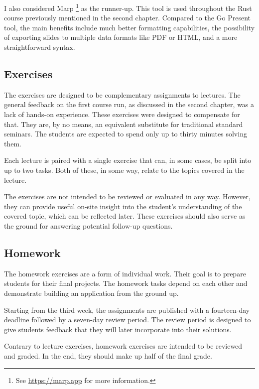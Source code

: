 \documentclass[
  digital,
  color,
  oneside,
  nosansbold,
  nocolorbold,
  lof,
  lot,
]{fithesis4}
\begin{document}
I also considered Marp
\footnote{See \url{https://marp.app} for more information.}
as the runner-up. This tool is used throughout the Rust course previously mentioned in the second chapter. Compared to the Go Present tool, the main benefits include much better formatting capabilities, the possibility of exporting slides to multiple data formats like PDF or HTML, and a more straightforward syntax.

\subsection{Exercises}

The exercises are designed to be complementary assignments to lectures. The general feedback on the first course run, as discussed in the second chapter, was a lack of hands-on experience. These exercises were designed to compensate for that. They are, by no means, an equivalent substitute for traditional standard seminars. The students are expected to spend only up to thirty minutes solving them.

Each lecture is paired with a single exercise that can, in some cases, be split into up to two tasks. Both of these, in some way, relate to the topics covered in the lecture.

The exercises are not intended to be reviewed or evaluated in any way. However, they can provide useful on-site insight into the student's understanding of the covered topic, which can be reflected later. These exercises should also serve as the ground for answering potential follow-up questions.

\subsection{Homework}

The homework exercises are a form of individual work. Their goal is to prepare students for their final projects. The homework tasks depend on each other and demonstrate building an application from the ground up.

Starting from the third week, the assignments are published with a fourteen-day deadline followed by a seven-day review period. The review period is designed to give students feedback that they will later incorporate into their solutions.

Contrary to lecture exercises, homework exercises are intended to be reviewed and graded. In the end, they should make up half of the final grade.
\end{document}
